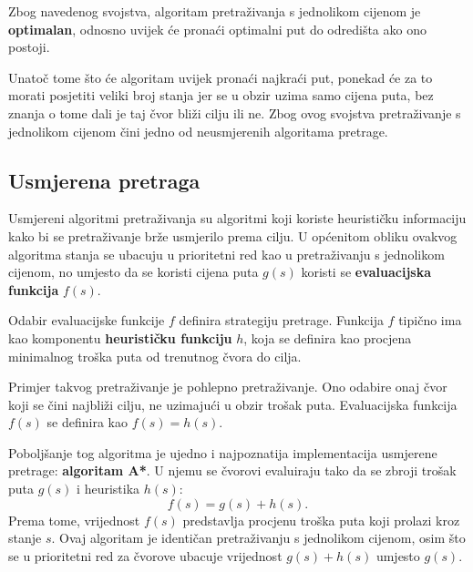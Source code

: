 \documentclass[times, utf8, zavrsni, numeric]{fer}
\begin{document}
\begin{minipage}{\textwidth}
	
\end{minipage}

\par Zbog navedenog svojstva, algoritam pretraživanja s jednolikom cijenom je \textbf{optimalan}, odnosno uvijek će pronaći optimalni put do odredišta ako ono postoji.


\par Unatoč tome što će algoritam uvijek pronaći najkraći put, ponekad će za to morati posjetiti veliki broj stanja jer se u obzir uzima samo cijena puta, bez znanja o tome dali je taj čvor bliži cilju ili ne. 
Zbog ovog svojstva pretraživanje s jednolikom cijenom čini jedno od neusmjerenih algoritama pretrage.

\subsection{Usmjerena pretraga}

\par Usmjereni algoritmi pretraživanja su algoritmi koji koriste heurističku informaciju kako bi se pretraživanje brže usmjerilo prema cilju.
U općenitom obliku ovakvog algoritma stanja se ubacuju u prioritetni red kao u pretraživanju s jednolikom cijenom, no umjesto da se koristi cijena puta \(g(s)\) koristi se \textbf{evaluacijska funkcija} \(f(s)\).

\par Odabir evaluacijske funkcije \(f\) definira strategiju pretrage. 
Funkcija \(f\) tipično ima kao komponentu \textbf{heurističku funkciju} \(h\), koja se definira kao procjena minimalnog troška puta od trenutnog čvora do cilja\cite{book:AIModernApproach}.

\par Primjer takvog pretraživanje je pohlepno pretraživanje. 
Ono odabire onaj čvor koji se čini najbliži cilju, ne uzimajući u obzir trošak puta.
Evaluacijska funkcija \(f(s)\) se definira kao \(f(s) = h(s)\).

\par Poboljšanje tog algoritma je ujedno i najpoznatija implementacija usmjerene pretrage: \textbf{algoritam A*}. 
U njemu se čvorovi evaluiraju tako da se zbroji trošak puta \(g(s)\) i heuristika \(h(s)\): 
\[f(s) = g(s) + h(s).\]
Prema tome, vrijednost \(f(s)\) predstavlja procjenu troška puta koji prolazi kroz stanje \(s\).
Ovaj algoritam je identičan pretraživanju s jednolikom cijenom, osim što se u prioritetni red za čvorove ubacuje vrijednost \(g(s) + h(s)\) umjesto \(g(s)\).
\end{document}
